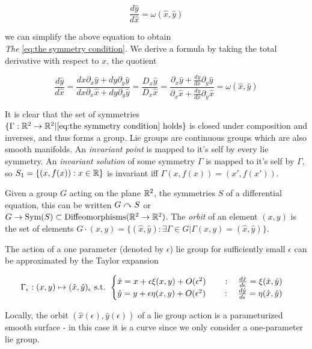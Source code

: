 \documentclass[12pt]{article}
\begin{document}
$$\frac{d\hat y}{d\hat x} = \omega(\hat x,\hat y)$$

we can simplify the above equation to obtain\\ \textit{The } \eqref{eq:the symmetry condition}. We derive a formula by taking the total derivative with respect to $x$, the quotient 

\begin{equation}\label{eq:the symmetry condition}
    \frac{d\hat y}{d\hat x} = \frac{dx \partial_x \hat y + dy \partial_y\hat y}{dx \partial_x \hat x + dy\partial_y \hat y} = \frac{D_x \hat y}{D_x \hat x} = \frac{\partial_x \hat y + \frac{dy}{dx}\partial_y\hat y}{\partial_x \hat x + \frac{dy}{dx}\partial_y\hat x} = \omega(\hat x,\hat y)
\end{equation}

It is clear that the set of symmetries $\{\Gamma : \mathbb{R}^2\to\mathbb{R}^2 | \eqref{eq:the symmetry condition}\,\,\text{holds} \}$ is closed under composition and inverses, and thus forms a group. Lie groups are continuous groups which are also smooth manifolds. An \textit{invariant point} is mapped to it's self by every lie symmetry. An \textit{invariant solution} of some symmetry $\Gamma$ is mapped to it's self by $\Gamma$, so $S_1 = \{(x,f(x)) : x\in \mathbb{R}\}$ is invariant iff $\Gamma(x,f(x)) = (x' , f( x'))$.  

Given a group $G$ acting on the plane $\mathbb{R}^2$, the symmetries $S$ of a differential equation, this can be written $G\curvearrowright S$ or $G\to \text{Sym}(S)\subset \text{Diffeomorphisms}( \mathbb{R}^2\to\mathbb{R}^2 )$. The \textit{orbit} of an element $(x,y)$ is the set of elements $G \cdot (x,y) = \{(\hat x, \hat y) : \exists \Gamma\in G | \Gamma (x,y) = (\hat x,\hat y) \}$. 

The action of a one parameter (denoted by $\epsilon$) lie group for sufficiently small $\epsilon$ can be approximated by the Taylor expansion

\begin{equation}\label{eq:one param lie group taylor}
    \Gamma_\epsilon : (x,y)\mapsto (\hat x,\hat y)_\epsilon\text{ s.t. } \begin{cases}\hat x = x + \epsilon \xi(x,y) + O(\epsilon^2)\qquad : \quad \frac{d\hat x}{d\epsilon} = \xi(\hat x,\hat y) \\ \hat y = y + \epsilon\eta(x,y) + O(\epsilon^2) \qquad :\quad \frac{d\hat y}{d\epsilon} = \eta(\hat x,\hat y) \end{cases}
\end{equation}

Locally, the orbit $(\hat x(\epsilon),\hat y(\epsilon))$ of a lie group action is a parameturized smooth surface - in this case it is a curve since we only consider a one-parameter lie group. 
\end{document}
